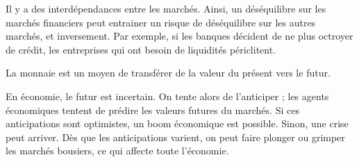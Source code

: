 Il y a des interdépendances entre les marchés. Ainsi, un déséquilibre sur les marchés financiers peut entrainer un risque de déséquilibre sur les autres marchés, et inversement. Par exemple, si les banques décident de ne plus octroyer de crédit, les entreprises qui ont besoin de liquidités périclitent.

La monnaie est un moyen de transférer de la valeur du présent vers le futur.

En économie, le futur est incertain. On tente alors de l'anticiper ; les agents économiques tentent de prédire les valeurs futures du marchés. Si ces anticipations sont optimistes, un boom économique est possible. Sinon, une crise peut arriver. Dès que les anticipations varient, on peut faire plonger ou grimper les marchés bousiers, ce qui affecte toute l'économie.
